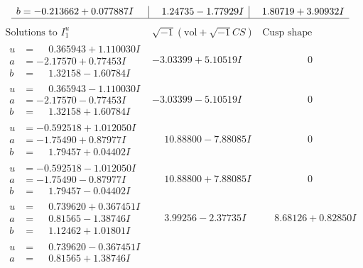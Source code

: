 \documentclass[1p]{elsarticle_modified}
\theoremstyle{definition}
\newcommand{\I}{\sqrt{-1}}
\begin{document}
$$\begin{array}{c|c|c}
\begin{aligned}
b &= -0.213662 + 0.077887 I\end{aligned}
 & \phantom{-}1.24735 - 1.77929 I & \phantom{-}1.80719 + 3.90932 I\\
 \hline 
 \end{array}$$\newpage$$\begin{array}{c|c|c}  
\text{Solutions to }I^u_{1}& \I (\text{vol} + \sqrt{-1}CS) & \text{Cusp shape}\\
 \hline 
\begin{aligned}
u &= \phantom{-}0.365943 + 1.110030 I \\
a &= -2.17570 + 0.77453 I \\
b &= \phantom{-}1.32158 - 1.60784 I\end{aligned}
 & -3.03399 + 5.10519 I & \phantom{-0.000000 } 0 \\ \hline\begin{aligned}
u &= \phantom{-}0.365943 - 1.110030 I \\
a &= -2.17570 - 0.77453 I \\
b &= \phantom{-}1.32158 + 1.60784 I\end{aligned}
 & -3.03399 - 5.10519 I & \phantom{-0.000000 } 0 \\ \hline\begin{aligned}
u &= -0.592518 + 1.012050 I \\
a &= -1.75490 + 0.87977 I \\
b &= \phantom{-}1.79457 + 0.04402 I\end{aligned}
 & \phantom{-}10.88800 - 7.88085 I & \phantom{-0.000000 } 0 \\ \hline\begin{aligned}
u &= -0.592518 - 1.012050 I \\
a &= -1.75490 - 0.87977 I \\
b &= \phantom{-}1.79457 - 0.04402 I\end{aligned}
 & \phantom{-}10.88800 + 7.88085 I & \phantom{-0.000000 } 0 \\ \hline\begin{aligned}
u &= \phantom{-}0.739620 + 0.367451 I \\
a &= \phantom{-}0.81565 - 1.38746 I \\
b &= \phantom{-}1.12462 + 1.01801 I\end{aligned}
 & \phantom{-}3.99256 - 2.37735 I & \phantom{-}8.68126 + 0.82850 I \\ \hline\begin{aligned}
u &= \phantom{-}0.739620 - 0.367451 I \\
a &= \phantom{-}0.81565 + 1.38746 I \\

\end{aligned}
\end{array}$$
\end{document}

